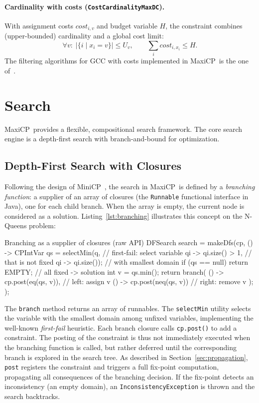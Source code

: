 \documentclass[11pt, a4paper]{scrartcl}
\newcommand{\maxicp}{\textsf{MaxiCP}}
\newcommand{\minicp}{\textsf{MiniCP}}
\begin{document}
\paragraph{Cardinality with costs (\texttt{CostCardinalityMaxDC}).}
With assignment costs $\mathit{cost}_{i,v}$ and budget variable $H$, the
constraint combines (upper-bounded) cardinality and a global cost limit:
\[
\forall v:\; \left|\{i \mid x_i = v\}\right| \le U_v,
\qquad
\sum_i \mathit{cost}_{i,x_i} \le H.
\]
The filtering algorithms for GCC with costs implemented in \maxicp\ is the one of~\cite{schmied2025efficient}.

\section{Search}
\label{sec:search}

\maxicp\ provides a flexible, compositional search framework. The core search engine is a depth-first search with branch-and-bound for optimization.

\subsection{Depth-First Search with Closures}

Following the design of \minicp~\cite{Michel2021MiniCP},
the search in \maxicp\ is defined by a \emph{branching function}:
a supplier of an array of closures (the \texttt{Runnable} functional interface in Java), one for each child branch.
When the array is empty, the current node is considered as a solution.
Listing~\ref{lst:branching} illustrates this concept on the N-Queens problem:

\begin{codebox}[label={lst:branching}]{Branching as a supplier of closures (raw API)}
DFSearch search = makeDfs(cp, () -> {
    CPIntVar qs = selectMin(q, // first-fail: select variable
        qi -> qi.size() > 1, //   that is not fixed
        qi -> qi.size()); //   with smallest domain
    if (qs == null) return EMPTY; // all fixed -> solution
    int v = qs.min();
    return branch(
        () -> cp.post(eq(qs, v)), // left: assign v
        () -> cp.post(neq(qs, v)) // right: remove v
    );
});
\end{codebox}

The \texttt{branch} method returns an array of runnables.
The \texttt{selectMin} utility selects the variable with the smallest domain among unfixed variables, implementing the well-known \emph{first-fail} heuristic.
Each branch closure calls \texttt{cp.post()} to add a constraint.
The posting of the constraint is thus not immediately executed when the branching function is called,
but rather deferred until the corresponding branch is explored in the search tree.
As described in Section~\ref{sec:propagation}, \texttt{post} registers the constraint and triggers a full fix-point computation,
propagating all consequences of the branching decision.
If the fix-point detects an inconsistency (an empty domain), an \texttt{InconsistencyException} is thrown and the search backtracks.
\end{document}
